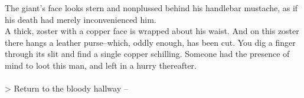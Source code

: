 The giant's face looks stern and nonplussed behind his handlebar mustache, as if his death had merely inconvenienced him.\\

A thick, zoster with a copper face is wrapped about his waist. And on this zoster there hangs a leather purse--which, oddly enough, has been cut. You dig a finger through its slit and find a single copper schilling. Someone had the presence of mind to loot this man, and left in a hurry thereafter.\\
\\

> Return to the bloody hallway -- 